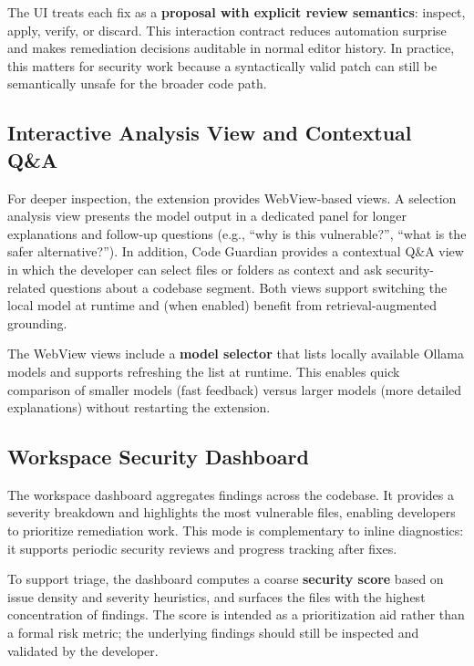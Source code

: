 The UI treats each fix as a \textbf{proposal with explicit review semantics}: inspect, apply, verify, or discard. This interaction contract reduces automation surprise and makes remediation decisions auditable in normal editor history. In practice, this matters for security work because a syntactically valid patch can still be semantically unsafe for the broader code path.

\subsection{Interactive Analysis View and Contextual Q\&A}
\label{subsec:ui-webview}

For deeper inspection, the extension provides WebView-based views. A selection analysis view presents the model output in a dedicated panel for longer explanations and follow-up questions (e.g., ``why is this vulnerable?'', ``what is the safer alternative?''). In addition, Code Guardian provides a contextual Q\&A view in which the developer can select files or folders as context and ask security-related questions about a codebase segment. Both views support switching the local model at runtime and (when enabled) benefit from retrieval-augmented grounding.

The WebView views include a \textbf{model selector} that lists locally available Ollama models and supports refreshing the list at runtime. This enables quick comparison of smaller models (fast feedback) versus larger models (more detailed explanations) without restarting the extension.

\subsection{Workspace Security Dashboard}
\label{subsec:ui-dashboard}

The workspace dashboard aggregates findings across the codebase. It provides a severity breakdown and highlights the most vulnerable files, enabling developers to prioritize remediation work. This mode is complementary to inline diagnostics: it supports periodic security reviews and progress tracking after fixes.

To support triage, the dashboard computes a coarse \textbf{security score} based on issue density and severity heuristics, and surfaces the files with the highest concentration of findings. The score is intended as a prioritization aid rather than a formal risk metric; the underlying findings should still be inspected and validated by the developer.

